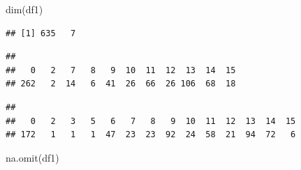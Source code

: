 \documentclass[
  oneside]{book}
\newenvironment{Shaded}{\begin{snugshade}}{\end{snugshade}}
\newcommand{\DecValTok}[1]{\textcolor[rgb]{0.00,0.00,0.81}{#1}}
\newcommand{\FunctionTok}[1]{\textcolor[rgb]{0.00,0.00,0.00}{#1}}
\newcommand{\NormalTok}[1]{#1}
\newcommand{\OtherTok}[1]{\textcolor[rgb]{0.56,0.35,0.01}{#1}}
\newcommand{\SpecialCharTok}[1]{\textcolor[rgb]{0.00,0.00,0.00}{#1}}
\begin{document}
\begin{Shaded}
\begin{Highlighting}[]
\FunctionTok{dim}\NormalTok{(df1)}
\end{Highlighting}
\end{Shaded}

\begin{verbatim}
## [1] 635   7
\end{verbatim}

\begin{Shaded}
\end{Shaded}

\begin{verbatim}
## 
##   0   2   7   8   9  10  11  12  13  14  15 
## 262   2  14   6  41  26  66  26 106  68  18
\end{verbatim}

\begin{Shaded}
\end{Shaded}

\begin{verbatim}
## 
##   0   2   3   5   6   7   8   9  10  11  12  13  14  15 
## 172   1   1   1  47  23  23  92  24  58  21  94  72   6
\end{verbatim}

\begin{Shaded}
\begin{Highlighting}[]
\FunctionTok{na.omit}\NormalTok{(df1)}
\end{Highlighting}
\end{Shaded}
\end{document}
